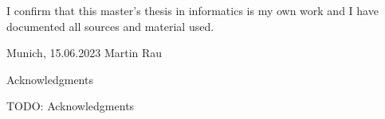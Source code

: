 \documentclass[headsepline,footsepline,footinclude=false,oneside,fontsize=11pt,paper=a4,listof=totoc,bibliography=totoc]{scrbook} %
\newcommand*{\getAuthor}{Martin Rau}
\newcommand*{\getDoctype}{Master's Thesis in Informatics}
\newcommand*{\getSubmissionDate}{15.06.2023}
\newcommand*{\getSubmissionLocation}{Munich}
\begin{document}

%
\thispagestyle{empty}
\vspace*{0.8\textheight}
\noindent
I confirm that this \MakeLowercase{\getDoctype{}} is my own work and I have documented all sources and material used.

\vspace{15mm}
\noindent
\getSubmissionLocation{}, \getSubmissionDate{} \hspace{50mm} \getAuthor{}

\cleardoublepage{}


%
\thispagestyle{empty}

\vspace*{20mm}

\begin{center}
{ Acknowledgments}
\end{center}

\vspace{10mm}

TODO: Acknowledgments

\cleardoublepage{}

\end{document}
